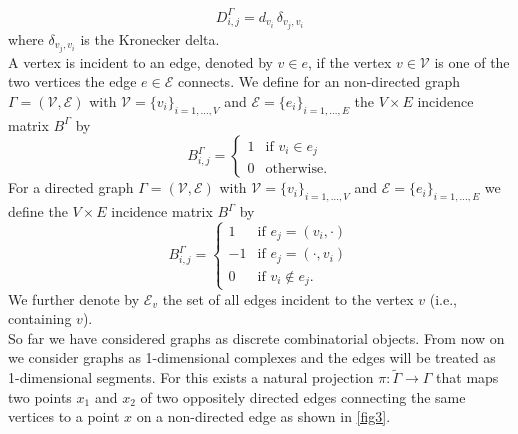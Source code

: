 \begin{equation}
    \label{degree matrix}
    D^{\Gamma}_{i, j} = d_{v_i} \, \delta_{v_j, v_i}
\end{equation}
where $\delta_{v_j, v_i}$ is the Kronecker delta. \\
A vertex is incident to an edge, denoted by $v \in e$, if the vertex $v \in \mathcal{V}$ is one of the two vertices the edge $e \in \mathcal{E}$ connects. We define for an non-directed graph $\Gamma = (\mathcal{V}, \mathcal{E})$ with $\mathcal{V} = \{v_i\}_{i = 1, \ldots, V}$ and $\mathcal{E} = \{e_i\}_{i = 1, \ldots, E}$ the $V \times E$ incidence matrix $B^{\Gamma}$ by  
\begin{equation}
    \label{incidence matrix non-directed}
    B^{\Gamma}_{i, j}= \begin{cases} 1 & \text{if } v_i \in e_j \\ 0 & \text{otherwise.} \end{cases}
\end{equation}
For a directed graph $\Gamma = (\mathcal{V}, \mathcal{E})$ with $\mathcal{V} = \{v_i\}_{i = 1, \ldots, V}$ and $\mathcal{E} = \{e_i\}_{i = 1, \ldots, E}$ we define the $V \times E$ incidence matrix $B^{\Gamma}$ by 
\begin{equation}
    \label{incidence matrix directed}
    B^{\Gamma}_{i, j}= \begin{cases} 1 & \text{if } e_j = (v_i, \cdot) \\ -1 & \text{if } e_j = (\cdot, v_i) \\ 0 & \text{if } v_i \notin e_j. \end{cases}
\end{equation}
We further denote by $\mathcal{E}_v$ the set of all edges incident to the vertex $v$ (i.e., containing $v$). \\

So far we have considered graphs as discrete combinatorial objects. From now on we consider graphs as 1-dimensional complexes and the edges will be treated as 1-dimensional segments. For this exists a natural projection $\pi \colon \widetilde{\Gamma} \to \Gamma$ that maps two points $x_1$ and $x_2$ of two oppositely directed edges connecting the same vertices to a point $x$ on a non-directed edge as shown in \cref{fig3}.

